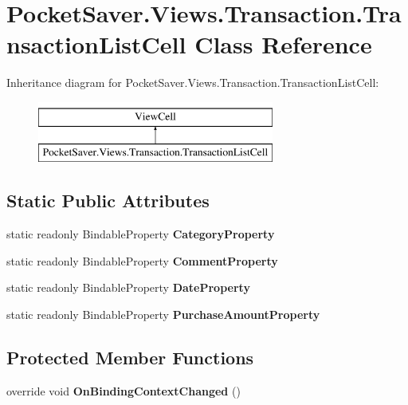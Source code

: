 \hypertarget{class_pocket_saver_1_1_views_1_1_transaction_1_1_transaction_list_cell}{}\section{Pocket\+Saver.\+Views.\+Transaction.\+Transaction\+List\+Cell Class Reference}
\label{class_pocket_saver_1_1_views_1_1_transaction_1_1_transaction_list_cell}
Inheritance diagram for Pocket\+Saver.\+Views.\+Transaction.\+Transaction\+List\+Cell\+:\begin{figure}[H]
\begin{center}
\leavevmode
\includegraphics[height=2.000000cm]{class_pocket_saver_1_1_views_1_1_transaction_1_1_transaction_list_cell}
\end{center}
\end{figure}
\subsection*{Static Public Attributes}
\begin{DoxyCompactItemize}
\item 
static readonly Bindable\+Property {\bfseries Category\+Property}
\item 
static readonly Bindable\+Property {\bfseries Comment\+Property}
\item 
static readonly Bindable\+Property {\bfseries Date\+Property}
\item 
static readonly Bindable\+Property {\bfseries Purchase\+Amount\+Property}
\end{DoxyCompactItemize}
\subsection*{Protected Member Functions}
\begin{DoxyCompactItemize}
\item 
\mbox{\label{class_pocket_saver_1_1_views_1_1_transaction_1_1_transaction_list_cell_a90e43ae65385f8f8e36d075798463d12}} 
override void {\bfseries On\+Binding\+Context\+Changed} ()
\end{DoxyCompactItemize}
